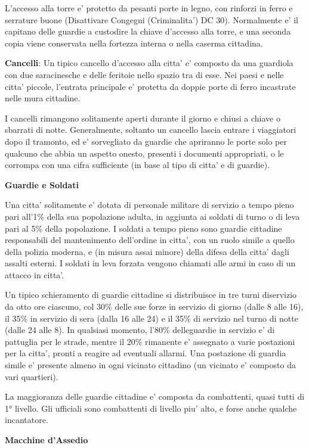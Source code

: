 \documentclass[a4paper,11pt,twoside,openany]{dndbook}
\begin{document}
{L'accesso alla torre e' protetto da pesanti porte in legno, con rinforzi in ferro e serrature buone (Disattivare Congegni (Criminalita') DC 30). Normalmente e' il capitano delle guardie a custodire la chiave d'accesso alla torre, e una seconda copia viene conservata nella fortezza interna o nella caserma cittadina.

\textbf{Cancelli}: Un tipico cancello d'accesso alla citta' e' composto da una guardiola con due saracinesche e delle feritoie nello spazio tra di esse. Nei paesi e nelle citta' piccole, l'entrata principale e' protetta da doppie porte di ferro incastrate nelle mura cittadine.

I cancelli rimangono solitamente aperti durante il giorno e chiusi a chiave o sbarrati di notte. Generalmente, soltanto un cancello lascia entrare i viaggiatori dopo il tramonto, ed e' sorvegliato da guardie che apriranno le porte solo per qualcuno che abbia un aspetto onesto, presenti i documenti appropriati, o le corrompa con una cifra sufficiente (in base al tipo di citta' e di guardie).

\textbf{Guardie e Soldati}

Una citta' solitamente e' dotata di personale militare di servizio a tempo pieno pari all'1\% della sua popolazione adulta, in aggiunta ai soldati di turno o di leva pari al 5\% della popolazione. I soldati a tempo pieno sono guardie cittadine responsabili del mantenimento dell'ordine in citta', con un ruolo simile a quello della polizia moderna, e (in misura assai minore) della difesa della citta' dagli assalti esterni. I soldati in leva forzata vengono chiamati alle armi in caso di un attacco in citta'.

Un tipico schieramento di guardie cittadine si distribuisce in tre turni diservizio da otto ore ciascuno, col 30\% delle sue forze in servizio di giorno (dalle 8 alle 16), il 35\% in servizio di sera (dalla 16 alle 24) e il 35\% di servizio nel turno di notte (dalle 24 alle 8). In qualsiasi momento, l'80\% delleguardie in servizio e' di pattuglia per le strade, mentre il 20\% rimanente e' assegnato a varie postazioni per la citta', pronti a reagire ad eventuali allarmi. Una postazione di guardia simile e' presente almeno in ogni vicinato cittadino (un vicinato e' composto da vari quartieri).

La maggioranza delle guardie cittadine e' composta da combattenti, quasi tutti di 1° livello. Gli ufficiali sono combattenti di livello piu' alto, e forse anche qualche incantatore.

\textbf{Macchine d'Assedio}

}
\end{document}
